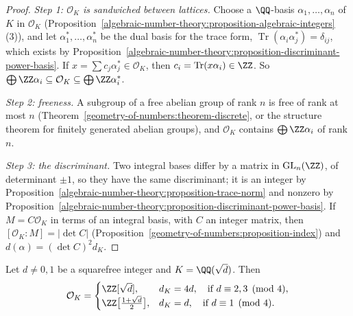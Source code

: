 \begin{proof}
\emph{Step 1: $\mathcal{O}_K$ is sandwiched between lattices.} Choose a $\QQ$-basis $\alpha_1, \dots, \alpha_n$ of $K$ in $\mathcal{O}_K$
(Proposition~\ref{algebraic-number-theory:proposition-algebraic-integers}(3)), and let $\alpha_1^*, \dots, \alpha_n^*$ be the dual basis for the trace form, $\operatorname{Tr}(\alpha_i\alpha_j^*) = \delta_{ij}$,
which exists by Proposition~\ref{algebraic-number-theory:proposition-discriminant-power-basis}. If $x = \sum c_j\alpha_j^* \in \mathcal{O}_K$, then $c_i = \operatorname{Tr}(x\alpha_i) \in \ZZ$. So
$\bigoplus\ZZ\alpha_i \subseteq \mathcal{O}_K \subseteq \bigoplus\ZZ\alpha_i^*$.

\emph{Step 2: freeness.} A subgroup of a free abelian group of rank $n$ is free of rank at most $n$ (Theorem~\ref{geometry-of-numbers:theorem-discrete}, or the structure theorem for finitely generated abelian
groups), and $\mathcal{O}_K$ contains $\bigoplus\ZZ\alpha_i$ of rank $n$.

\emph{Step 3: the discriminant.} Two integral bases differ by a matrix in $\mathrm{GL}_n(\ZZ)$, of determinant $\pm1$, so they have the same discriminant; it is an integer by
Proposition~\ref{algebraic-number-theory:proposition-trace-norm} and nonzero by Proposition~\ref{algebraic-number-theory:proposition-discriminant-power-basis}. If $M = C\mathcal{O}_K$ in terms of an integral
basis, with $C$ an integer matrix, then $[\mathcal{O}_K : M] = |\det C|$ (Proposition~\ref{geometry-of-numbers:proposition-index}) and $d(\alpha) = (\det C)^2d_K$.
\end{proof}

\begin{theorem}\label{algebraic-number-theory:theorem-quadratic-integers}
Let $d \neq 0, 1$ be a squarefree integer and $K = \QQ(\sqrt d)$. Then
\[
\mathcal{O}_K = \begin{cases} \ZZ[\sqrt d], & d_K = 4d, \quad \text{if } d \equiv 2, 3 \pmod 4,\\ \ZZ\bigl[\frac{1 + \sqrt d}{2}\bigr], & d_K = d, \quad \text{if } d \equiv 1 \pmod 4.\end{cases}
\]
\end{theorem}


